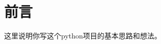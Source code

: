 \documentclass[11pt,oneside]{book}
\begin{document}
\frontmatter

\author{作者}
\titleLC

\chapter*{前言}
\begin{common-format}
这里说明你写这个python项目的基本思路和想法。





\end{common-format}


\setcounter{tocdepth}{2}
\tableofcontents
\end{document}
